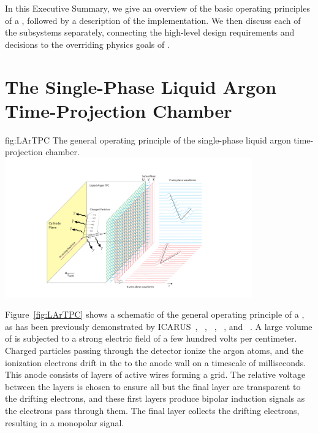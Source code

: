 In this Executive Summary, we give an overview of the basic operating principles of a  , followed by a description of the  implementation. We then discuss each of the subsystems separately, connecting the high-level design requirements and decisions to the overriding physics goals of .

\section{The Single-Phase Liquid Argon Time-Projection Chamber}
\label{sec:fdsp-exec-splar}

\begin{dunefigure}{fig:LArTPC}
{The general operating principle of the single-phase liquid argon time-projection chamber.}
\includegraphics[trim=5cm 0 5cm 0,clip,width=0.8\textwidth]{graphics/TheBoPicture.pdf}
\end{dunefigure}

Figure~\ref{fig:LArTPC} shows a schematic of the general operating principle of a  , as has been previously demonstrated by
ICARUS~\cite{Icarus-T600},
~\cite{Anderson:2012vc}, ~\cite{microboone}, ~\cite{Cavanna:2014iqa}, and ~\cite{Abi:2017aow}. A large volume of  is subjected to a strong electric field of a few hundred volts per centimeter. Charged particles passing through the detector ionize the argon atoms, and the ionization electrons drift in the \efield to the anode wall on a timescale of milliseconds. This anode consists of layers of active wires forming a grid. The relative voltage between the layers is chosen to ensure all but the final layer are transparent to the drifting electrons, and these first layers produce bipolar induction signals as the electrons pass through them. The final layer collects the drifting electrons, resulting in a monopolar signal.

